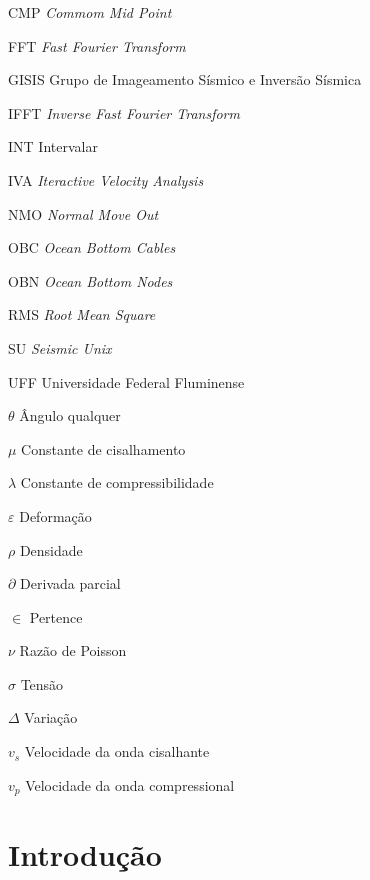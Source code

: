 \documentclass[
	12pt,				%
	openright,			%
	oneside,			%
	a4paper,			%
	english,			%
	brazil				%
	]{abntex2}
\begin{document}
\begin{siglas}
  \item[CMP] \textit{Commom Mid Point} 
  \item[FFT] \textit{Fast Fourier Transform}
  \item[GISIS] Grupo de Imageamento Sísmico e Inversão Sísmica
  \item[IFFT] \textit{Inverse Fast Fourier Transform}
  \item[INT] Intervalar
  \item[IVA] \textit{Iteractive Velocity Analysis}
  \item[NMO] \textit{Normal Move Out}
  \item[OBC] \textit{Ocean Bottom Cables}
  \item[OBN] \textit{Ocean Bottom Nodes}
  \item[RMS] \textit{Root Mean Square}
  \item[SU] \textit{Seismic Unix}  
  \item[UFF] Universidade Federal Fluminense
\end{siglas}

\begin{simbolos}
  \item[$ \theta $] Ângulo qualquer 
  \item[$ \mu $] Constante de cisalhamento
  \item[$ \lambda $] Constante de compressibilidade 
  \item[$ \varepsilon $] Deformação
  \item[$ \rho $] Densidade
  \item[$ \partial $] Derivada parcial
  \item[$ \in $] Pertence
  \item[$ \nu $] Razão de Poisson
  \item[$ \sigma $] Tensão
  \item[$ \Delta $] Variação
  \item[$ v_s $] Velocidade da onda cisalhante
  \item[$ v_p $] Velocidade da onda compressional
\end{simbolos}

\tableofcontents*
\cleardoublepage

\textual

\chapter{Introdução}
\end{document}
